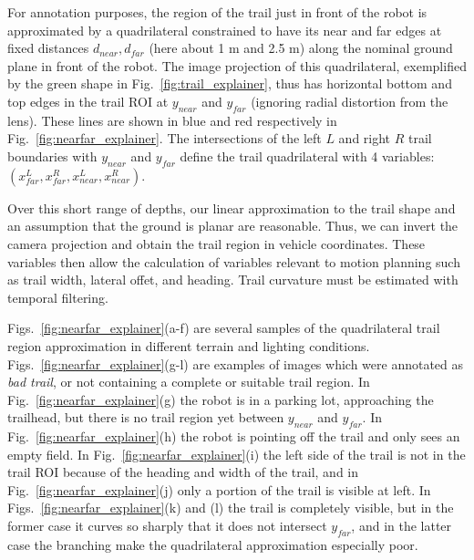 \documentclass[letterpaper, 10 pt, conference]{ieeeconf}  %
\newcommand{\comment}[1]{\textcolor{red}{#1}}
\begin{document}
For annotation purposes, the region of the trail just in front of the
robot is approximated by a quadrilateral constrained to have its near
and far edges at fixed distances $d_{near}, d_{far}$ (here about 1 m and
2.5 m) along the nominal ground plane in front of the robot.  The
image projection of this quadrilateral, exemplified by the green shape
in Fig.~\ref{fig:trail_explainer}, thus has horizontal bottom and top
edges in the trail ROI at $y_{near}$ and $y_{far}$ (ignoring radial
distortion from the lens).  These lines are shown in blue and red
respectively in Fig.~\ref{fig:nearfar_explainer}.  The intersections
of the left $L$ and right $R$ trail boundaries with $y_{near}$ and
$y_{far}$ define the trail quadrilateral with 4 variables:
$(x^{L}_{far}, x^{R}_{far}, x^{L}_{near}, x^{R}_{near})$.

Over this short range of depths, our linear approximation to the trail
shape and an assumption that the ground is planar are reasonable.
Thus, we can invert the camera projection
and obtain the trail region in vehicle coordinates.  These variables
then allow the calculation of variables relevant to motion planning
such as trail width, lateral offet, and heading.  Trail curvature must
be estimated with temporal filtering.

Figs.~\ref{fig:nearfar_explainer}(a-f) are several samples of the
quadrilateral trail region approximation in different terrain and
lighting conditions.  Figs.~\ref{fig:nearfar_explainer}(g-l) are
examples of images which were annotated as \textit{bad trail}, or not
containing a complete or suitable trail region.  In
Fig.~\ref{fig:nearfar_explainer}(g) the robot is in a parking lot,
approaching the trailhead, but there is no trail region yet between
$y_{near}$ and $y_{far}$.  In Fig.~\ref{fig:nearfar_explainer}(h) the
robot is pointing off the trail and only sees an empty field.  In
Fig.~\ref{fig:nearfar_explainer}(i) the left side of the trail is not
in the trail ROI because of the heading and width of the trail, and in
Fig.~\ref{fig:nearfar_explainer}(j) only a portion of the trail is
visible at left.  In Figs.~\ref{fig:nearfar_explainer}(k) and (l) the
trail is completely visible, but in the former case it curves so
sharply that it does not intersect $y_{far}$, and in the latter case
the branching make the quadrilateral approximation especially poor.


\end{document}
